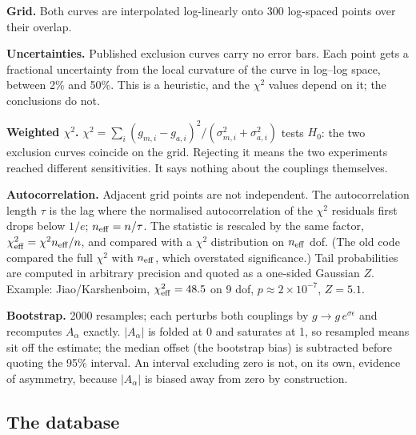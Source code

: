\documentclass[11pt,a4paper]{article}
\newcommand{\Aa}{A_\alpha}
\begin{document}
\textbf{Grid.} Both curves are interpolated log-linearly onto 300
log-spaced points over their overlap.

\textbf{Uncertainties.} Published exclusion curves carry no error bars.
Each point gets a fractional uncertainty from the local curvature of the
curve in log--log space, between 2\% and 50\%. This is a heuristic, and
the $\chi^2$ values depend on it; the conclusions do not.

\textbf{Weighted $\chi^2$.} $\chi^2=\sum_i (g_{m,i}-g_{a,i})^2/(\sigma_{m,i}^2
+\sigma_{a,i}^2)$ tests $H_0$: the two exclusion curves coincide on the
grid. Rejecting it means the two experiments reached different
sensitivities. It says nothing about the couplings themselves.

\textbf{Autocorrelation.} Adjacent grid points are not independent. The
autocorrelation length $\tau$ is the lag where the normalised
autocorrelation of the $\chi^2$ residuals first drops below $1/e$;
$n_{\rm eff}=n/\tau$. The statistic is rescaled by the same factor,
$\chi^2_{\rm eff}=\chi^2 n_{\rm eff}/n$, and compared with a $\chi^2$
distribution on $n_{\rm eff}$ dof. (The old code compared the full
$\chi^2$ with $n_{\rm eff}$, which overstated significance.) Tail
probabilities are computed in arbitrary precision and quoted as a
one-sided Gaussian $Z$. Example: Jiao/Karshenboim, $\chi^2_{\rm
eff}=48.5$ on 9 dof, $p\approx2\times10^{-7}$, $Z=5.1$.

\textbf{Bootstrap.} 2000 resamples; each perturbs both couplings by
$g\to g\,e^{\sigma\epsilon}$ and recomputes $\Aa$ exactly. $|\Aa|$ is
folded at 0 and saturates at 1, so resampled means sit off the estimate;
the median offset (the bootstrap bias) is subtracted before quoting the
95\% interval. An interval excluding zero is not, on its own, evidence of
asymmetry, because $|\Aa|$ is biased away from zero by construction.

\subsection{The database}
\end{document}

